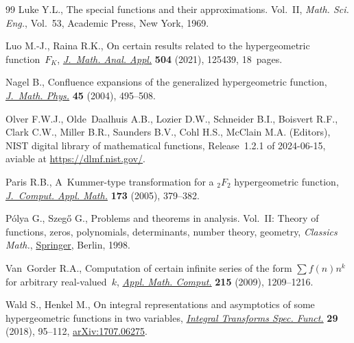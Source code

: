 \documentclass[pdftex]{sigma}
\numberwithin{equation}{section}
\begin{document}
\begin{thebibliography}{99}
Luke Y.L., The special functions and their approximations. {V}ol.~{II},
 \textit{Math. Sci. Eng.}, Vol.~53, Academic Press, New York, 1969.

Luo M.-J., Raina R.K., On certain results related to the hypergeometric
 function~{$F_K$}, \href{https://doi.org/10.1016/j.jmaa.2021.125439}{\textit{J.~Math. Anal. Appl.}} \textbf{504} (2021), 125439,
 18~pages.

Nagel B., Confluence expansions of the generalized hypergeometric function,
 \href{https://doi.org/10.1063/1.1629777}{\textit{J.~Math. Phys.}} \textbf{45} (2004), 495--508.

Olver F.W.J., Olde~Daalhuis A.B., Lozier D.W., Schneider B.I., Boisvert R.F.,
 Clark C.W., Miller B.R., Saunders B.V., Cohl H.S., McClain M.A. (Editors),
 NIST digital library of mathematical functions, {R}elease~1.2.1 of
 2024-06-15, aviable at \url{https://dlmf.nist.gov/}.

Paris R.B., A~{K}ummer-type transformation for a {$_2F_2$} hypergeometric
 function, \href{https://doi.org/10.1016/j.cam.2004.05.005}{\textit{J.~Comput. Appl. Math.}} \textbf{173} (2005), 379--382.

P\'olya G., Szeg\H{o} G., Problems and theorems in analysis. {V}ol.~{II}:
 {T}heory of functions, zeros, polynomials, determinants, number theory,
 geometry, \textit{Classics Math.}, \href{https://doi.org/10.1007/978-3-642-61905-2}{Springer}, Berlin, 1998.

Van~Gorder R.A., Computation of certain infinite series of the form {$\sum
 f(n)n^k$} for arbitrary real-valued~{$k$}, \href{https://doi.org/10.1016/j.amc.2009.06.064}{\textit{Appl. Math. Comput.}}
 \textbf{215} (2009), 1209--1216.

Wald S., Henkel M., On integral representations and asymptotics of some
 hypergeometric functions in two variables, \href{https://doi.org/10.1080/10652469.2017.1404596}{\textit{Integral Transforms Spec.
 Funct.}} \textbf{29} (2018), 95--112, \href{https://arxiv.org/abs/1707.06275}{arXiv:1707.06275}.

\end{thebibliography}\LastPageEnding
		
\end{document}
